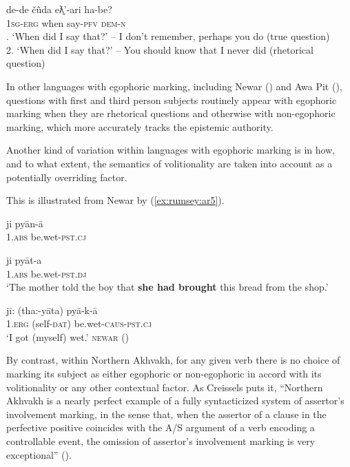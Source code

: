 \documentclass[output=paper]{langsci/langscibook}
\begin{document}
\begin{exe}
	\ex \label{ex:rumsey:ar4}
	\gll de-de čũda	eƛ̱’-ari	ha-be?\\
	1\textsc{sg}-\textsc{erg}	when say-\textsc{pfv} \textsc{dem}-\textsc{n}\\
	. ‘When did I say that?’ – I don’t remember, perhaps you do (true question)\\
	2. ‘When did I say that?’ – You should know that I never did (rhetorical question) \cite[11]{Creissels2008}
\end{exe}

In other languages with egophoric marking, including Newar (\citealt[249]{HaleWatters1973}) and Awa Pit (\citealt[614-615]{Curnow2002a}), questions with first and third person subjects routinely appear with egophoric marking when they are rhetorical questions and otherwise with non-egophoric marking, which more accurately tracks the epistemic authority.
 
Another kind of variation within languages with egophoric marking is in how, and to what extent, the semantics of volitionality are taken into account as a potentially overriding factor.

This is illustrated from Newar by (\ref{ex:rumsey:ar5}).

\begin{exe}
	\ex \label{ex:rumsey:ar5}
	\begin{xlist}
		\ex \label{ex:rumsey:ar5a}
		\gll *ji pyān-ā\\
		1.\textsc{abs} be.wet-\textsc{pst}.\textsc{cj}\\
		\trans

		\ex \label{ex:rumsey:ar5b}
		\gll ji pyāt-a\\
		1.\textsc{abs} be.wet-\textsc{pst}.\textsc{dj}\\
		\trans ‘The mother told the boy that \textbf{she had brought} this bread from the shop.’
		
		\ex \label{ex:rumsey:ar5c}
		\gll jī: (tha:-yāta) pyā-k-ā\\
		1.\textsc{erg} (self-\textsc{dat}) be.wet-\textsc{caus}-\textsc{pst}.\textsc{cj}\\
		\trans ‘I got (myself) wet.’ \textsc{newar} (\citealt[29]{Hargreaves2005})
	\end{xlist}	
\end{exe}

By contrast, within Northern Akhvakh, for any given verb there is no choice of marking its subject as either egophoric or non-egophoric in accord with its volitionality or any other contextual factor.  As Creissels puts it, “Northern Akhvakh is a nearly perfect example of a fully syntacticized system of assertor’s involvement marking, in the sense that, when the assertor of a clause in the perfective positive coincides with the A/S argument of a verb encoding a controllable event, the omission of assertor’s involvement marking is very exceptional” (\citealt[12--13]{Creissels2008}).
\end{document}
